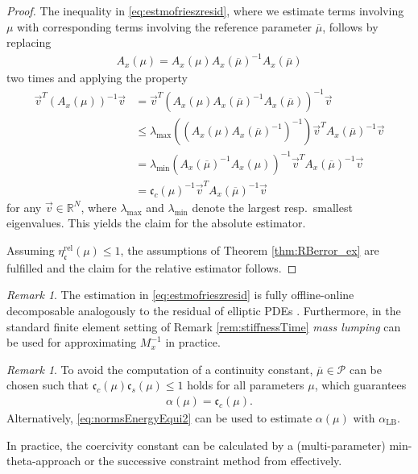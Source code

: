 \documentclass{article}
\theoremstyle{plain}
\theoremstyle{definition}
\theoremstyle{remark}
\newtheorem{remark}[theorem]{Remark}
\newcommand{\RR}{\mathbb{R}}
\newcommand{\RBestCcREL}{\eta_\mathfrak{c}^\text{rel}}
\begin{document}
\begin{proof}
The inequality in \eqref{eq:estmofrieszresid}, where we estimate terms involving $\mu$ with corresponding terms involving the reference parameter $\overline{\mu}$, follows by replacing
\begin{align}
    A_x(\mu) = A_x(\mu)A_x(\overline{\mu})^{-1}A_x(\overline{\mu})
\end{align}
two times and applying the property
\begin{align}
    \Vec{v}^T \left(A_x(\mu)\right)^{-1} \Vec{v} &= \Vec{v}^T \left(A_x(\mu)A_x(\overline{\mu})^{-1}A_x(\overline{\mu})\right)^{-1} \Vec{v} \\&\leq \lambda_{\max}\left(\left(A_x(\mu)A_x(\overline{\mu})^{-1}\right)^{-1}\right) \Vec{v}^T A_x(\overline{\mu})^{-1} \Vec{v} \\
    &= \lambda_{\min}\left(A_x(\overline{\mu})^{-1} A_x(\mu)\right)^{-1} \Vec{v}^T A_x(\overline{\mu})^{-1} \Vec{v} \\
    &= \mathfrak{c}_c(\mu)^{-1} \Vec{v}^T A_x(\overline{\mu})^{-1} \Vec{v}
\end{align}
for any $\Vec{v} \in \RR^N$, where $\lambda_{\max}$ and $\lambda_{\min}$ denote the largest resp.~smallest eigenvalues. This yields the claim for the absolute estimator. 

Assuming $\RBestCcREL(\mu) \leq 1$, the assumptions of Theorem \ref{thm:RBerror_ex} are fulfilled and the claim for the relative estimator follows.
\end{proof}
\begin{remark} The estimation in \eqref{eq:estmofrieszresid} is fully offline-online decomposable analogously to the residual of elliptic PDEs \cite[§~4.2.5]{Hesthaven2016}. Furthermore, in the standard finite element setting of Remark \ref{rem:stiffnessTime} \textit{mass lumping} can be used for approximating $M_x^{-1}$ in practice. 
\end{remark}

\begin{remark}
To avoid the computation of a continuity constant, $\overline{\mu} \in \mathcal{P}$ can be chosen such that $\mathfrak{c}_c(\mu)\mathfrak{c}_s(\mu) \leq 1$ holds for all parameters $\mu$, which guarantees 
\begin{align}
    \alpha(\mu) = \mathfrak{c}_c(\mu) .
\end{align}
Alternatively, \eqref{eq:normsEnergyEqui2} can be used to estimate $\alpha(\mu)$ with $\alpha_\text{LB}$.
\end{remark}

In practice, the coercivity constant can be calculated by a (multi-parameter) min-theta-approach \cites[§4.2.2]{RozzaRB}[§~4.3.2]{Hesthaven2016} or the successive constraint method from \cite{CRMATH_2007__345_8_473_0} effectively.
\end{document}
